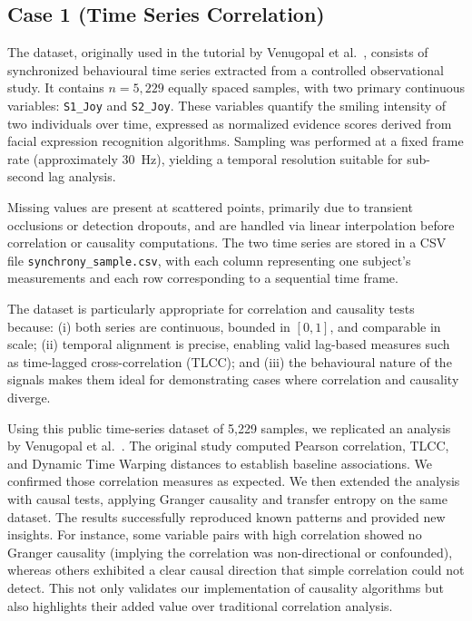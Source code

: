 \subsection{Case 1 (Time Series Correlation)}
The dataset, originally used in the tutorial by Venugopal et al.~\cite{Venugopal2023}, consists of synchronized behavioural time series extracted from a controlled observational study. It contains $n = 5,229$ equally spaced samples, with two primary continuous variables: \texttt{S1\_Joy} and \texttt{S2\_Joy}. These variables quantify the smiling intensity of two individuals over time, expressed as normalized evidence scores derived from facial expression recognition algorithms. Sampling was performed at a fixed frame rate (approximately 30~Hz), yielding a temporal resolution suitable for sub-second lag analysis.  

Missing values are present at scattered points, primarily due to transient occlusions or detection dropouts, and are handled via linear interpolation before correlation or causality computations. The two time series are stored in a CSV file \texttt{synchrony\_sample.csv}, with each column representing one subject’s measurements and each row corresponding to a sequential time frame.  

The dataset is particularly appropriate for correlation and causality tests because:  
(i) both series are continuous, bounded in $[0,1]$, and comparable in scale;  
(ii) temporal alignment is precise, enabling valid lag-based measures such as time-lagged cross-correlation (TLCC); and  
(iii) the behavioural nature of the signals makes them ideal for demonstrating cases where correlation and causality diverge.  

Using this public time-series dataset of 5,229 samples, we replicated an analysis by Venugopal et al.~\cite{Venugopal2023}. The original study computed Pearson correlation, TLCC, and Dynamic Time Warping distances to establish baseline associations. We confirmed those correlation measures as expected. We then extended the analysis with causal tests, applying Granger causality and transfer entropy on the same dataset. The results successfully reproduced known patterns and provided new insights. For instance, some variable pairs with high correlation showed no Granger causality (implying the correlation was non-directional or confounded), whereas others exhibited a clear causal direction that simple correlation could not detect. This not only validates our implementation of causality algorithms but also highlights their added value over traditional correlation analysis.  


